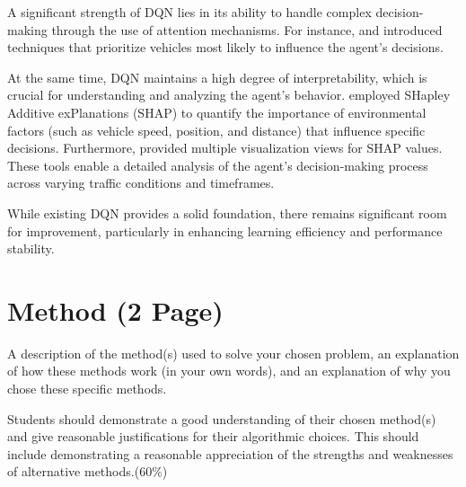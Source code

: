 \documentclass{article}
\begin{document}
A significant strength of DQN lies in its ability to handle complex decision-making through the use of attention mechanisms. For instance, \citep{leurent_social_2019} and \citep{bellotti_designing_2023} introduced techniques that prioritize vehicles most likely to influence the agent’s decisions.  

At the same time, DQN maintains a high degree of interpretability, which is crucial for understanding and analyzing the agent's behavior. \citep{bellotti_explaining_2023} employed SHapley Additive exPlanations (SHAP) to quantify the importance of environmental factors (such as vehicle speed, position, and distance) that influence specific decisions. Furthermore, \citep{bellotti_designing_2023} provided multiple visualization views for SHAP values. These tools enable a detailed analysis of the agent’s decision-making process across varying traffic conditions and timeframes.

While existing DQN provides a solid foundation, there remains significant room for improvement, particularly in enhancing learning efficiency and performance stability. 



\section{Method (2 Page)}
A description of the method(s) used to solve your chosen problem, an explanation of how these methods work (in your own words), and an explanation of why you chose these specific methods.

Students should demonstrate a good understanding of their chosen method(s) and give reasonable justifications for their algorithmic choices. This should include demonstrating a reasonable appreciation of the strengths and weaknesses of alternative methods.(60\%)
\end{document}
